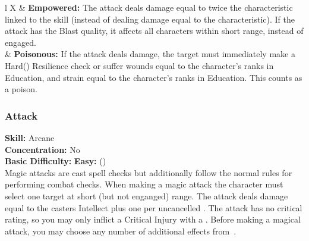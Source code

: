 \begin{table*}[!htb]
\begin{GenesysTable}{l X}
\difficulty\difficulty  & \textbf{Empowered:} The attack deals damage equal to twice the characteristic linked to the skill (instead
                            of dealing damage equal to the characteristic). If the attack has the  Blast quality, it affects
                            all characters within short range, instead of engaged.\\
\difficulty\difficulty  & \textbf{Poisonous:} If the attack deals damage, the target must immediately make a
                            Hard(\difficulty\difficulty\difficulty) Resilience check or suffer wounds equal to the character's
                            ranks in Education, and strain equal to the character's ranks in Education. This counts as a poison.\\
\end{GenesysTable}
\label{table:magic_attack}
\end{table*}

\subsubsection{Attack}
\textbf{Skill:} Arcane\\
\textbf{Concentration:} No\\
\textbf{Basic Difficulty:} \textbf{Easy:} (\difficulty)\\
Magic attacks are cast spell checks but additionally follow the normal rules for
performing combat checks. When making a magic attack the character must select
one target at short (but not enganged) range. The attack deals damage equal to
the casters Intellect plus one per uncancelled \success. The attack has no
critical rating, so you may only inflict a Critical Injury with a \triumph.
Before making a magical attack, you may choose any number of additional effects
from~.

